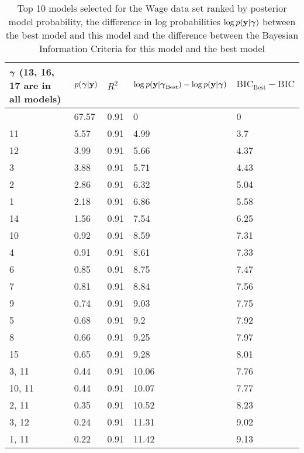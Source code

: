 \documentclass{amsart}
\begin{document}
\begin{table}
\label{tab:numerical_results_wage}
\caption{Top 10 models selected for the Wage data set ranked by posterior model probability, the difference
					in log probabilities $\log p({\bf y}|{\boldsymbol \gamma})$ between the best model and this model and the difference
					between the Bayesian Information Criteria for this model and the best model}
\begin{tabular}{|l|llll|}
\hline
${\boldsymbol \gamma}$ (13, 16, 17 are in all models) & $p({\boldsymbol \gamma}|{\bf y})$ & $R^2$ & $\log p({\bf y} | {\boldsymbol \gamma}_\text{Best}) - \log p({\bf y} | {\boldsymbol \gamma})$ & $\text{BIC}_\text{Best} - \text{BIC}$ \\
\hline
&  67.57&  0.91&  0&  0\\
11&  5.57&  0.91&  4.99&  3.7\\
12&  3.99&  0.91&  5.66&  4.37\\
3&  3.88&  0.91&  5.71&  4.43\\
2&  2.86&  0.91&  6.32&  5.04\\
1&  2.18&  0.91&  6.86&  5.58\\
14&  1.56&  0.91&  7.54&  6.25\\
10&  0.92&  0.91&  8.59&  7.31\\
4&  0.91&  0.91&  8.61&  7.33\\
6&  0.85&  0.91&  8.75&  7.47\\
7&  0.81&  0.91&  8.84&  7.56\\
9&  0.74&  0.91&  9.03&  7.75\\
5&  0.68&  0.91&  9.2&  7.92\\
8&  0.66&  0.91&  9.25&  7.97\\
15&  0.65&  0.91&  9.28&  8.01\\
3, 11&  0.44&  0.91&  10.06&  7.76\\
10, 11&  0.44&  0.91&  10.07&  7.77\\
2, 11&  0.35&  0.91&  10.52&  8.23\\
3, 12&  0.24&  0.91&  11.31&  9.02\\
1, 11&  0.22&  0.91&  11.42&  9.13\\
\hline
\end{tabular}
\end{table}
\end{document}
